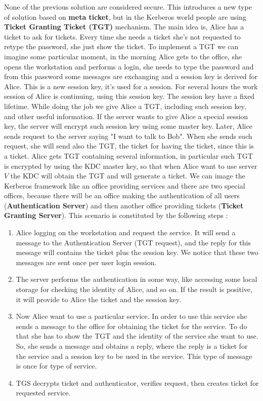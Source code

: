 \documentclass[11pt]{article}
\begin{document}
None of the previous solution are considered secure. This introduces a new type of solution based on \textbf{meta ticket}, but in the Kerberos world people are using \textbf{Ticket Granting Ticket (TGT)} mechanism. The main idea is, Alice has a ticket to ask for tickets. Every time she needs a ticket she's not requested to retype the password, she just show the ticket. To implement a TGT we can imagine some particular moment, in the morning Alice gets to the office, she opens the workstation and performs a login, she needs to type the password and from this password some messages are exchanging and a session key is derived for Alice. This is a new session key, it's used for a session. For several hours the work session of Alice is continuing, using this session key. The session key have a fixed lifetime. While doing the job we give Alice a TGT, including such session key, and other useful information. If the server wants to give Alice a special session key, the server will encrypt such session key using some master key. Later, Alice sends request to the server saying "I want to talk to Bob". When she sends such request, she will send also the TGT, the ticket for having the ticket, since this is a ticket. Alice gets TGT containing several information, in particular such TGT is encrypted by using the KDC master key, so that when Alice want to use server $V$ the KDC will obtain the TGT and will generate a ticket. We can image the Kerberos framework like an office providing services and there are two special offices, because there will be an office making the authentication of all users (\textbf{Authentication Server}) and then another office providing tickets (\textbf{Ticket Granting Server}). This scenario is constituted by the following steps :
\begin{enumerate}
\item Alice logging on the workstation and request the service. It will send a message to the Authentication Server (TGT request), and the reply for this message will contains the ticket plus the session key. We notice that these two messages are sent once per user login session.
\item The server performs the authentication in some way, like accessing some local storage for checking the identity of Alice, and so on. If the result is positive, it will provide to Alice the ticket and the session key.
\item Now Alice want to use a particular service. In order to use this service she sends a message to the office for obtaining the ticket for the service. To do that she has to show the TGT and the identity of the service she want to use. So, she sends a message and obtains a reply, where the reply is a ticket for the service and a session key to be used in the service. This type of message is once for type of service.
\item TGS decrypts ticket and authenticator, verifies request, then creates ticket for requested service.
\end{enumerate}
\end{document}
